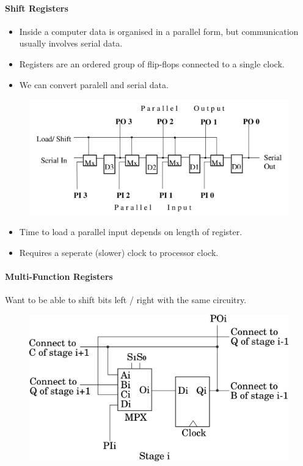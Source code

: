 \documentclass[twocolumn,english]{article}
\begin{document}
\paragraph{Shift Registers}
\begin{itemize}
\item Inside a computer data is organised in a parallel form, but communication
usually involves serial data.
\item Registers are an ordered group of flip-flops connected to a single
clock.
\item We can convert paralell and serial data.
\end{itemize}
\begin{figure}[H]
\noindent \centering{}\includegraphics[width=0.35\paperwidth]{img/register}
\end{figure}

\begin{itemize}
\item Time to load a parallel input depends on length of register.
\item Requires a seperate (slower) clock to processor clock.
\end{itemize}

\paragraph{Multi-Function Registers}

Want to be able to shift bits left / right with the same circuitry.

\begin{figure}[H]
\noindent \centering{}\includegraphics[width=0.3\paperwidth]{img/mfregister}
\end{figure}
\end{document}
